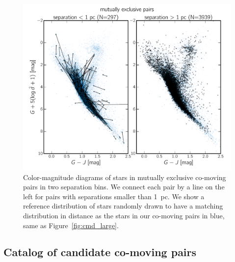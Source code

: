 \documentclass[manuscript, letterpaper]{aastex6}
\begin{document}
\begin{figure}[htbp]
  \begin{center}
    \includegraphics[width=\textwidth]{figures/gjg_mepairs.pdf}
  \end{center}
  \caption{
    Color-magnitude diagrams of stars in mutually exclusive co-moving pairs
    in two separation bins.
    We connect each pair by a line on the left for pairs
    with separations smaller than 1~pc.
    We show a reference distribution of stars randomly drawn to have
    a matching distribution in distance as the stars in our co-moving pairs
    in blue, same as Figure~\ref{fig:cmd_large}.
    \label{fig:cmd_me}}
\end{figure}

\subsection{Catalog of candidate co-moving pairs}
\end{document}
